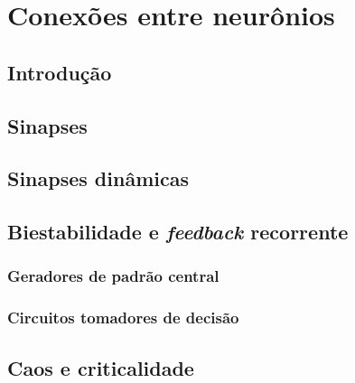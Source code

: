 \chapter{Conexões entre neurônios}\label{cap:conexoes}
\section{Introdução}\label{sec:conexoes_intro}

\section{Sinapses}\label{sec:sinapses}

\section{Sinapses dinâmicas}\label{sec:dinamicas}

\section{Biestabilidade e \textit{feedback} recorrente}\label{sec:biestabilidade}

\subsection{Geradores de padrão central}

\subsection{Circuitos tomadores de decisão}

\section{Caos e criticalidade}\label{sec:caos}
